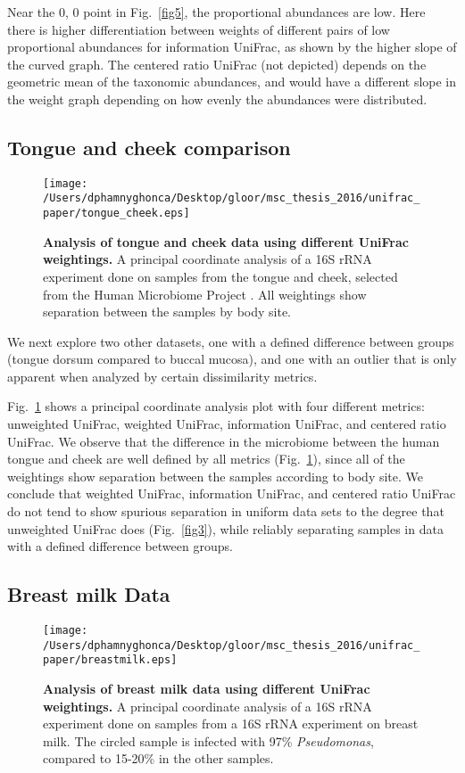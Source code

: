 \documentclass[10pt,letterpaper]{article}
\begin{document}
Near the 0, 0 point in Fig.~\ref{fig5}, the proportional abundances are low. Here there is higher differentiation between weights of different pairs of low proportional abundances for information UniFrac, as shown by the higher slope of the curved graph. The centered ratio UniFrac (not depicted) depends on the geometric mean of the taxonomic abundances, and would have a different slope in the weight graph depending on how evenly the abundances were distributed.

\subsection{Tongue and cheek comparison}

\begin{figure}[h]
\texttt{[image: /Users/dphamnyghonca/Desktop/gloor/msc\_thesis\_2016/unifrac\_paper/tongue\_cheek.eps]}
\caption{{\bf Analysis of tongue and cheek data using different UniFrac weightings. }
A principal coordinate analysis of a 16S rRNA experiment done on samples from the tongue and cheek, selected from the Human Microbiome Project \cite{turnbaugh2007human}. All weightings show separation between the samples by body site. }
\label{fig6}
\end{figure}

We next explore two other datasets, one with a defined difference between groups (tongue dorsum compared to buccal mucosa), and one with an outlier that is only apparent when analyzed by certain dissimilarity metrics.

Fig.~\ref{fig6} shows a principal coordinate analysis plot with four different metrics: unweighted UniFrac, weighted UniFrac, information UniFrac, and centered ratio UniFrac. We observe that the difference in the microbiome between the human tongue and cheek are well defined by all metrics (Fig.~\ref{fig6}), since all of the weightings show separation between the samples according to body site. We conclude that weighted UniFrac, information UniFrac, and centered ratio UniFrac do not tend to show spurious separation in uniform data sets to the degree that unweighted UniFrac does (Fig.~\ref{fig3}), while reliably separating samples in data with a defined difference between groups.

\subsection{Breast milk Data}

\begin{figure}[h]
\texttt{[image: /Users/dphamnyghonca/Desktop/gloor/msc\_thesis\_2016/unifrac\_paper/breastmilk.eps]}
\caption{{\bf Analysis of breast milk data using different UniFrac weightings. }
A principal coordinate analysis of a 16S rRNA experiment done on samples from a 16S rRNA experiment on breast milk. The circled sample is infected with 97\% \textit{Pseudomonas}, compared to 15-20\% in the other samples. }
\label{fig7}
\end{figure}
\end{document}
